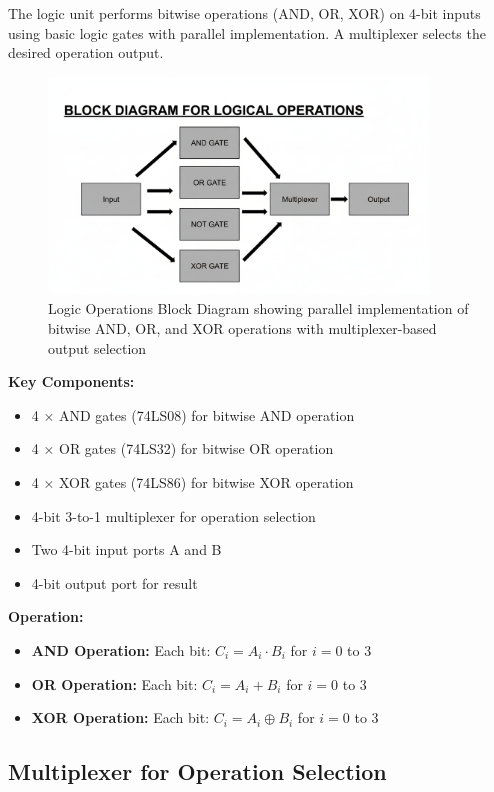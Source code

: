 The logic unit performs bitwise operations (AND, OR, XOR) on 4-bit inputs using basic logic gates with parallel implementation. A multiplexer selects the desired operation output.

\begin{figure}[h]
    \centering
    \includegraphics[width=0.9\textwidth]{local-operations}
    \caption{Logic Operations Block Diagram showing parallel implementation of bitwise AND, OR, and XOR operations with multiplexer-based output selection}
    \label{fig:logic-operations}
\end{figure}

\textbf{Key Components:}
\begin{itemize}
    \item 4 × AND gates (74LS08) for bitwise AND operation
    \item 4 × OR gates (74LS32) for bitwise OR operation
    \item 4 × XOR gates (74LS86) for bitwise XOR operation
    \item 4-bit 3-to-1 multiplexer for operation selection
    \item Two 4-bit input ports A and B
    \item 4-bit output port for result
\end{itemize}

\textbf{Operation:}
\begin{itemize}
    \item \textbf{AND Operation:} Each bit: $C_i = A_i \cdot B_i$ for $i = 0$ to $3$
    \item \textbf{OR Operation:} Each bit: $C_i = A_i + B_i$ for $i = 0$ to $3$
    \item \textbf{XOR Operation:} Each bit: $C_i = A_i \oplus B_i$ for $i = 0$ to $3$
\end{itemize}

\subsection{Multiplexer for Operation Selection}

